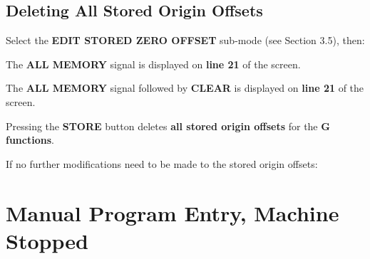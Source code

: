 \begin{itemize}
\end{itemize}

\newpage

\subsection{Deleting All Stored Origin Offsets}

Select the \textbf{EDIT STORED ZERO OFFSET} sub-mode (see Section 3.5), then:

\begin{itemize}
\end{itemize}

\vspace{.5cm}

The \textbf{ALL MEMORY} signal is displayed on \textbf{line 21} of the screen.

\begin{itemize}
\end{itemize}

\vspace{.5cm}

The \textbf{ALL MEMORY} signal followed by \textbf{CLEAR} is displayed on \textbf{line 21} of the screen.

\begin{itemize}
\end{itemize}

\vspace{.5cm}

Pressing the \textbf{STORE} button deletes \textbf{all stored origin offsets} for the \textbf{G functions}.

If no further modifications need to be made to the stored origin offsets:

\begin{itemize}
\end{itemize}
\vspace{.5cm}
\section{Manual Program Entry, Machine Stopped}

